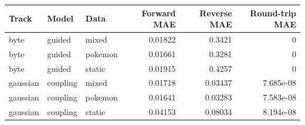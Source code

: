 \begin{tabular}{lllrrr}
\toprule
Track & Model & Data & Forward MAE & Reverse MAE & Round-trip MAE \\
\midrule
byte & guided & mixed & 0.01822 & 0.3421 & 0 \\
byte & guided & pokemon & 0.01661 & 0.3281 & 0 \\
byte & guided & static & 0.01915 & 0.4257 & 0 \\
gaussian & coupling & mixed & 0.01718 & 0.03437 & 7.685e-08 \\
gaussian & coupling & pokemon & 0.01641 & 0.03283 & 7.583e-08 \\
gaussian & coupling & static & 0.04153 & 0.08034 & 8.194e-08 \\
\bottomrule
\end{tabular}
